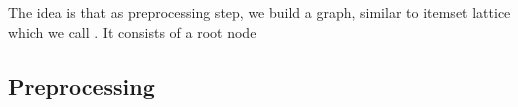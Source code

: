 \chapter{\graphname}
\label{ch:intro}

The idea is that as preprocessing step, we build a graph, similar to itemset lattice which we call \graphname. It consists of a root node

\section{Preprocessing}
